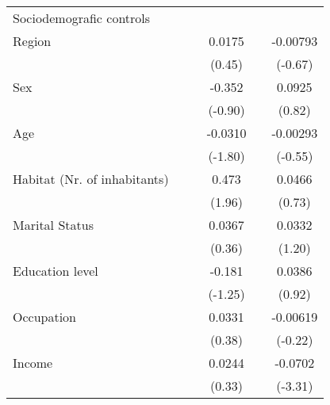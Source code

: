 {\begin{tabular}{l*{5}{c}}
Sociodemografic controls&                  &                  &                  &                  &                  \\
Region          &                  &                  &   0.0175         &                  & -0.00793         \\
                &                  &                  &   (0.45)         &                  &  (-0.67)         \\
Sex             &                  &                  &   -0.352         &                  &   0.0925         \\
                &                  &                  &  (-0.90)         &                  &   (0.82)         \\
Age             &                  &                  &  -0.0310         &                  & -0.00293         \\
                &                  &                  &  (-1.80)         &                  &  (-0.55)         \\
Habitat (Nr. of inhabitants)&                  &                  &    0.473\sym{*}  &                  &   0.0466         \\
                &                  &                  &   (1.96)         &                  &   (0.73)         \\
Marital Status  &                  &                  &   0.0367         &                  &   0.0332         \\
                &                  &                  &   (0.36)         &                  &   (1.20)         \\
Education level &                  &                  &   -0.181         &                  &   0.0386         \\
                &                  &                  &  (-1.25)         &                  &   (0.92)         \\
Occupation      &                  &                  &   0.0331         &                  & -0.00619         \\
                &                  &                  &   (0.38)         &                  &  (-0.22)         \\
Income          &                  &                  &   0.0244         &                  &  -0.0702\sym{***}\\
                &                  &                  &   (0.33)         &                  &  (-3.31)         \\

\end{tabular}}
